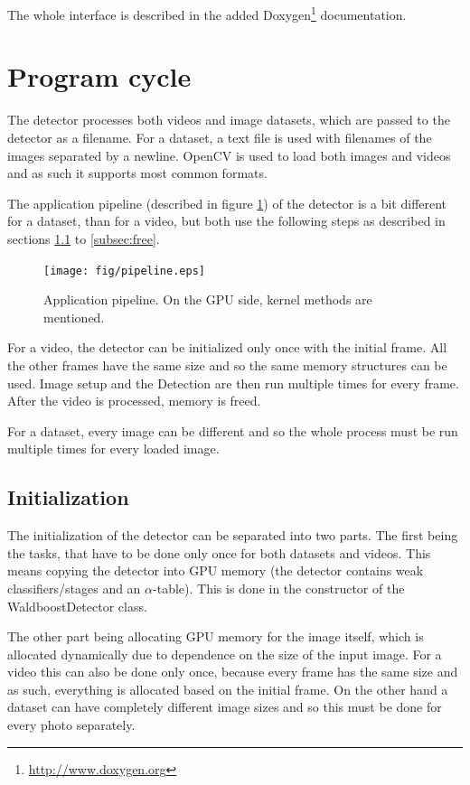 The whole interface is described in the added Doxygen\footnote{\url{http://www.doxygen.org}} documentation.

\section{Program cycle}

The detector processes both videos and image datasets, which are passed to the detector as a filename. For a dataset, a text file is used with filenames of the images separated by a newline. OpenCV is used to load both images and videos and as such it supports most common formats.

The application pipeline (described in figure \ref{fig:pipeline}) of the detector is a bit different for a dataset, than for a video, but both use the following steps as described in sections \ref{subsec:init} to \ref{subsec:free}.

\begin{center}
\begin{figure}[h!]
	\centering\texttt{[image: fig/pipeline.eps]}
	\caption{Application pipeline. On the GPU side, kernel methods are mentioned.}
	\label{fig:pipeline}	
\end{figure}
\end{center}

For a video, the detector can be initialized only once with the initial frame. All the other frames have the same size and so the same memory structures can be used. Image setup and the Detection are then run multiple times for every frame. After the video is processed, memory is freed.

For a dataset, every image can be different and so the whole process must be run multiple times for every loaded image.

\subsection{Initialization}\label{subsec:init}

The initialization of the detector can be separated into two parts. The first being the tasks, that have to be done only once for both datasets and videos. This means copying the detector into GPU memory (the detector contains weak classifiers/stages and an $\alpha$-table). This is done in the constructor of the WaldboostDetector class.

The other part being allocating GPU memory for the image itself, which is allocated dynamically due to dependence on the size of the input image. For a video this can also be done only once, because every frame has the same size and as such, everything is allocated based on the initial frame. On the other hand a dataset can have completely different image sizes and so this must be done for every photo separately.

